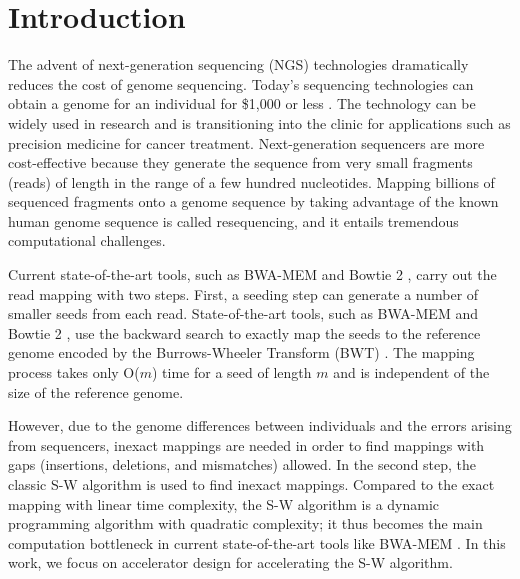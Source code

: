 \section{Introduction} 
\label{sec:introduction}

The advent of next-generation sequencing (NGS) technologies dramatically reduces the cost of genome sequencing. 
Today's sequencing technologies can obtain a genome for an individual for \$1,000 or less \cite{Mardis2006}. 
The technology can be widely used in research and is transitioning into the clinic for applications such as precision medicine for cancer treatment. 
Next-generation sequencers are more cost-effective because they generate the sequence 
from very small fragments (reads) of length in the range of a few hundred nucleotides. 
Mapping billions of sequenced fragments onto a genome sequence by taking advantage of the known human genome sequence 
is called resequencing, and it entails tremendous computational challenges.

Current state-of-the-art tools, such as BWA-MEM \cite{BWA}\cite{BWA-SW}\cite{BWA-MEM} and Bowtie 2 \cite{Bowtie}\cite{Bowtie2}, 
carry out the read mapping with two steps. 
First, a seeding step can generate a number of smaller seeds from each read. 
State-of-the-art tools, such as BWA-MEM \cite{BWA-MEM} and Bowtie 2 \cite{Bowtie2}, 
use the backward search to exactly map the seeds to the reference genome encoded by the Burrows-Wheeler Transform (BWT) \cite{BWT}.
The mapping process takes only O($m$) time for a seed of length $m$ and is independent of the size of the reference genome.

However, due to the genome differences between individuals and the errors arising from sequencers,
inexact mappings are needed in order to find mappings with gaps (insertions, deletions, and mismatches) allowed. 
In the second step, the classic S-W algorithm is used to find inexact mappings.
Compared to the exact mapping with linear time complexity, the S-W algorithm is a dynamic programming algorithm 
with quadratic complexity; it thus becomes the main computation bottleneck in current state-of-the-art tools like BWA-MEM \cite{BWA-MEM}. 
In this work, we focus on accelerator design for accelerating the S-W algorithm.

